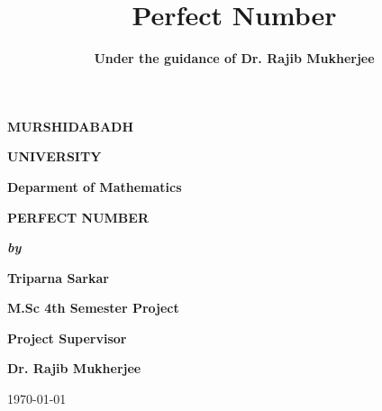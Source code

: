\documentclass[12pt,,a4paper]{book}
\title{\textbf{Perfect Number}}
\author{\textbf{Under the guidance of Dr. Rajib Mukherjee }}
\begin{document}
\begin{titlepage}
    

\onecolumn

\begin{center}




\textbf{\fontsize{33}{\baselineskip}\selectfont MURSHIDABADH}

\bigskip
\bigskip


\textbf{\fontsize{33}{\baselineskip}\selectfont UNIVERSITY}
\bigskip

\bigskip
\bigskip
\bigskip

\textbf{\fontsize{20}{\baselineskip}\selectfont Deparment of Mathematics }


\bigskip
\bigskip


\bigskip



\bigskip
\bigskip

\textbf{\fontsize{22}{\baselineskip}\selectfont PERFECT NUMBER}

\bigskip

\bigskip

\bigskip

\textit{\textbf{\fontsize{17}{\baselineskip}\selectfont by}}

\bigskip

\bigskip

\bigskip

\textbf{\fontsize{20}{\baselineskip}\selectfont Triparna Sarkar }

\bigskip

\bigskip



\bigskip

\textbf{\fontsize{17}{\baselineskip}\selectfont M.Sc 4th Semester Project }
\bigskip
\bigskip

\textbf{\fontsize{16}{\baselineskip}\selectfont Project Supervisor }

\bigskip

\bigskip

\textbf{\fontsize{17}{\baselineskip}\selectfont Dr. Rajib Mukherjee  }




\bigskip

\bigskip

{\today}
\end{center}

\clearpage
\end{titlepage}
\end{document}
